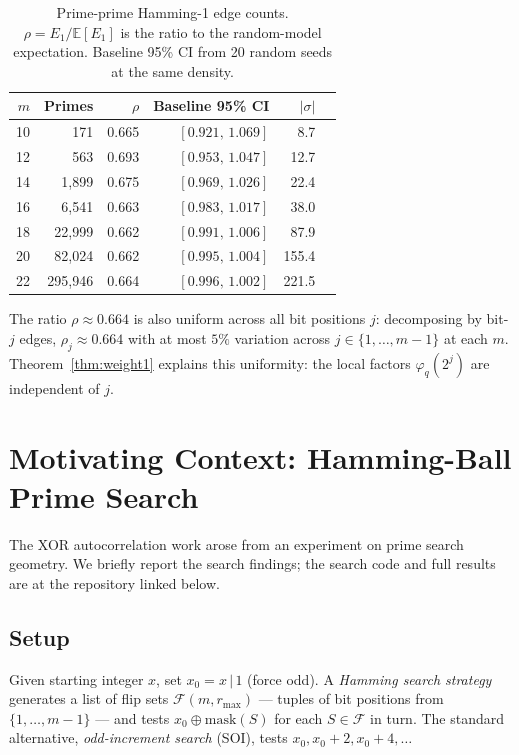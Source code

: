 \documentclass[12pt]{article}
\newcommand{\E}{\mathbb{E}}
\begin{document}
\begin{table}[h]
\centering
\caption{Prime-prime Hamming-1 edge counts.
$\rho = E_1/\E[E_1]$ is the ratio to the random-model expectation.
Baseline 95\% CI from 20 random seeds at the same density.}
\label{tab:edges}
\begin{tabular}{rrrrrr}
\toprule
$m$ & Primes & $\rho$ & Baseline 95\% CI & $|\sigma|$ \\
\midrule
10 &     171 & 0.665 & $[0.921,\,1.069]$ &   8.7 \\
12 &     563 & 0.693 & $[0.953,\,1.047]$ &  12.7 \\
14 &   1{,}899 & 0.675 & $[0.969,\,1.026]$ &  22.4 \\
16 &   6{,}541 & 0.663 & $[0.983,\,1.017]$ &  38.0 \\
18 &  22{,}999 & 0.662 & $[0.991,\,1.006]$ &  87.9 \\
20 &  82{,}024 & 0.662 & $[0.995,\,1.004]$ & 155.4 \\
22 & 295{,}946 & 0.664 & $[0.996,\,1.002]$ & 221.5 \\
\bottomrule
\end{tabular}
\end{table}

The ratio $\rho \approx 0.664$ is also uniform across all bit positions $j$:
decomposing by bit-$j$ edges, $\rho_j \approx 0.664$ with at most $5\%$
variation across $j \in \{1,\ldots,m-1\}$ at each $m$.
Theorem~\ref{thm:weight1} explains this uniformity:
the local factors $\varphi_q(2^j)$ are independent of $j$.

\section{Motivating Context: Hamming-Ball Prime Search}
\label{sec:search}

The XOR autocorrelation work arose from an experiment on prime search geometry.
We briefly report the search findings; the search code and full results are at the
repository linked below.

\subsection{Setup}

Given starting integer $x$, set $x_0 = x \,|\, 1$ (force odd).
A \emph{Hamming search strategy} generates a list of flip sets
$\mathcal{F}(m, r_{\max})$ --- tuples of bit positions from $\{1,\ldots,m-1\}$ ---
and tests $x_0 \oplus \mathrm{mask}(S)$ for each $S \in \mathcal{F}$ in turn.
The standard alternative, \emph{odd-increment search} (SOI),
tests $x_0, x_0+2, x_0+4, \ldots$
\end{document}
